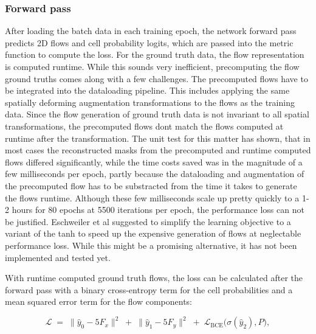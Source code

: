 \subsubsection{Forward pass}
After loading the batch data in each training epoch, the network forward pass predicts 2D flows and cell probability logits, which are passed into the metric function to compute the loss. For the ground truth data, the flow representation is computed runtime. While this sounds very inefficient, precomputing the flow ground truths comes along with a few challenges. The precomputed flows have to be integrated into the dataloading pipeline. This includes applying the same spatially deforming augmentation transformations to the flows as the training data. Since the flow generation of ground truth data is not invariant to all spatial transformations, the precomputed flows dont match the flows computed at runtime after the transformation. The unit test for this matter has shown, that in most cases the reconstructed masks from the precomputed and runtime computed flows differed significantly, while the time costs saved was in the magnitude of a few milliseconds per epoch, partly because the dataloading and augmentation of the precomputed flow has to be substracted from the time it takes to generate the flows runtime. Although these few milliseconds scale up pretty quickly to a 1-2 hours for 80 epochs at 5500 iterations per epoch, the performance loss can not be justified. Eschweiler et al \cite{eschweiler} suggested to simplify the learning objective to a variant of the tanh to speed up the expensive generation of flows at neglectable performance loss. While this might be a promising alternative, it has not been implemented and tested yet.

With runtime computed ground truth flows, the loss can be calculated after the forward pass with a binary cross-entropy term for the cell probabilities and a mean squared error term for the flow components:

\begin{equation} 
\mathcal{L} \;=\; \| \hat{y}_0 - 5 F_x \|^2 \;+\; \| \hat{y}_1 - 5 F_y \|^2 
\;+\; \mathcal{L}_{\text{BCE}} \bigl(\sigma(\hat{y}_2), P \bigr),
\end{equation}

